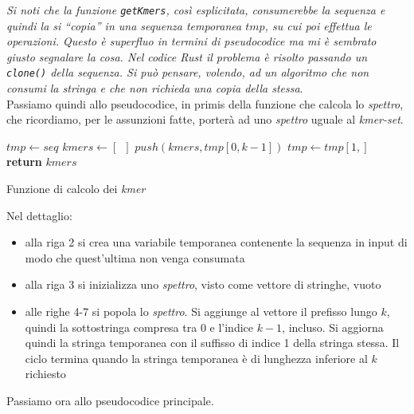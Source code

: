 \documentclass[a4paper,12pt, oneside]{book}
\begin{document}
\textit{Si noti che la funzione \texttt{getKmers}, così esplicitata,
  consumerebbe la sequenza e quindi la si ``copia'' in una sequenza temporanea
  $tmp$, su cui poi effettua le operazioni. Questo è
  superfluo in termini di pseudocodice ma mi è sembrato giusto segnalare la
  cosa. Nel codice Rust il problema è risolto passando un \texttt{clone()} della
  sequenza. Si può pensare, volendo, ad un algoritmo che non consumi la stringa
  e che non richieda una copia della stessa}.\\
\noindent
Passiamo quindi allo pseudocodice, in primis della funzione che calcola lo
\textit{spettro}, che ricordiamo, per le assunzioni fatte, porterà ad uno
\textit{spettro} uguale al \textit{kmer-set}. 
\begin{algorithm}[H]
  \begin{algorithmic}[1]
    \State $tmp\gets seq$
    \State $kmers \gets [\,\,\,]$
    \State $push(kmers, tmp[0,k-1])$
    \State $tmp \gets tmp[1,]$
    \EndWhile
    \State \textbf{return} $kmers$
    \EndFunction
  \end{algorithmic}
  \caption{Funzione di calcolo dei \textit{kmer}}
\end{algorithm}
\noindent
Nel dettaglio:
\begin{itemize}
  \item alla riga 2 si crea una variabile temporanea contenente la sequenza in
  input di modo che quest'ultima non venga consumata
  \item alla riga 3 si inizializza uno \textit{spettro}, visto come vettore di
  stringhe, vuoto
  \item alle righe 4-7 si popola lo \textit{spettro}. Si aggiunge al vettore il
  prefisso lungo $k$, quindi la sottostringa compresa tra 0 e l'indice $k-1$,
  incluso. Si aggiorna quindi la stringa temporanea con il suffisso di indice 1
  della stringa stessa. Il ciclo termina quando la stringa temporanea è di
  lunghezza inferiore al $k$ richiesto
\end{itemize}
\newpage
\noindent
Passiamo ora allo pseudocodice principale.
\end{document}
